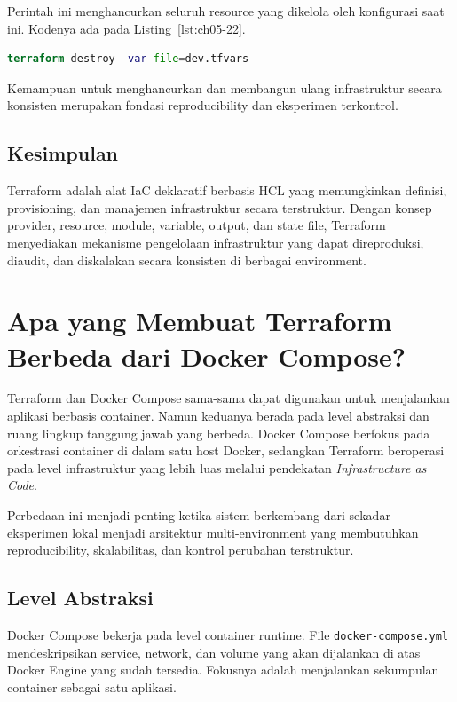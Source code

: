 Perintah ini menghancurkan seluruh resource yang dikelola oleh konfigurasi saat ini. Kodenya ada pada Listing~\ref{lst:ch05-22}.

\begin{lstlisting}[language=terraform, caption={Potongan kode Terraform pada terraform destroy}, label={lst:ch05-22}]
terraform destroy -var-file=dev.tfvars
\end{lstlisting}

Kemampuan untuk menghancurkan dan membangun ulang infrastruktur secara konsisten merupakan fondasi reproducibility dan eksperimen terkontrol.

\subsection*{Kesimpulan}

Terraform adalah alat IaC deklaratif berbasis HCL yang memungkinkan definisi, provisioning, dan manajemen infrastruktur secara terstruktur. Dengan konsep provider, resource, module, variable, output, dan state file, Terraform menyediakan mekanisme pengelolaan infrastruktur yang dapat direproduksi, diaudit, dan diskalakan secara konsisten di berbagai environment.


\section[Apa yang Membuat Terraform Berbeda]{Apa yang Membuat Terraform Berbeda dari Docker Compose?}

Terraform dan Docker Compose sama-sama dapat digunakan untuk menjalankan aplikasi berbasis container. Namun keduanya berada pada level abstraksi dan ruang lingkup tanggung jawab yang berbeda. Docker Compose berfokus pada orkestrasi container di dalam satu host Docker, sedangkan Terraform beroperasi pada level infrastruktur yang lebih luas melalui pendekatan \textit{Infrastructure as Code}.

Perbedaan ini menjadi penting ketika sistem berkembang dari sekadar eksperimen lokal menjadi arsitektur multi-environment yang membutuhkan reproducibility, skalabilitas, dan kontrol perubahan terstruktur.

\subsection{Level Abstraksi}

Docker Compose bekerja pada level container runtime. File \texttt{docker-compose.yml} mendeskripsikan service, network, dan volume yang akan dijalankan di atas Docker Engine yang sudah tersedia. Fokusnya adalah menjalankan sekumpulan container sebagai satu aplikasi.

